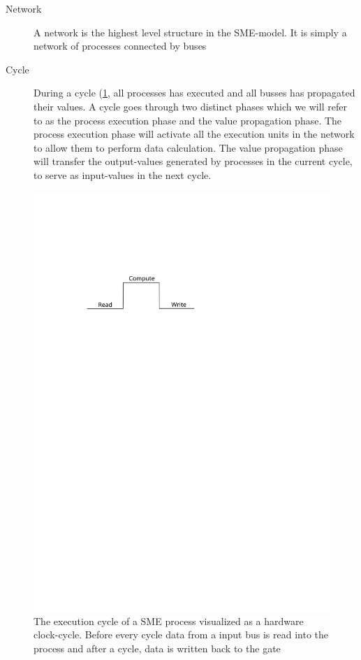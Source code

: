\begin{description}
  \item[Network] A network is the highest level structure in the
    SME-model. It is simply a network of processes connected by buses
  \item[Cycle] During a cycle (\cref{fig:cycle}, all processes has
    executed and all busses has propagated their values. A cycle goes
    through two distinct phases which we will refer to as the process
    execution phase and the value propagation phase. The process
    execution phase will activate all the execution units in the
    network to allow them to perform data calculation. The value
    propagation phase will transfer the output-values generated by
    processes in the current cycle, to serve as input-values in the
    next cycle.
\end{description}
\begin{figure}
\centering
\includegraphics{figures/execution-cycle}
\caption[Execution flow of a SME-process]{The execution cycle of a
  SME process visualized as a hardware clock-cycle. Before every cycle
  data from a input bus is read into the process and after a cycle,
  data is written back to the gate}
\label{fig:cycle}
\end{figure}


